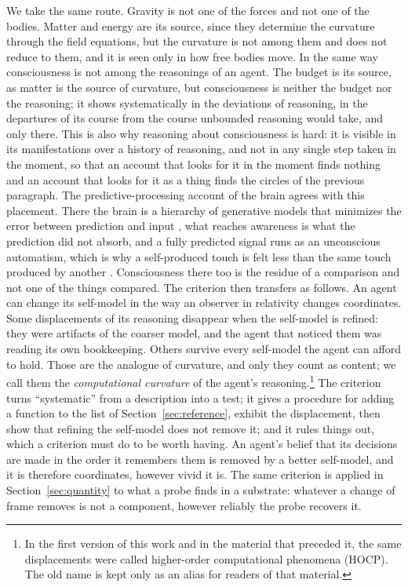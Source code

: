 We take the same route. Gravity is not one of the forces and not one of the bodies. Matter and energy
are its source, since they determine the curvature through the field equations, but the curvature is
not among them and does not reduce to them, and it is seen only in how free bodies move. In the same
way consciousness is not among the reasonings of an agent. The budget is its source, as matter is the
source of curvature, but consciousness is neither the budget nor the reasoning; it shows
systematically in the deviations of reasoning, in the departures of its course from the course
unbounded reasoning would take, and only there. This is also why reasoning about consciousness is hard: it is visible in its manifestations over
a history of reasoning, and not in any single step taken in the moment, so that an account that looks
for it in the moment finds nothing and an account that looks for it as a thing finds the circles of
the previous paragraph. The predictive-processing account of the brain agrees with this placement.
There the brain is a hierarchy of generative models that minimizes the error between prediction and
input \citep{friston2010,clark2013}, what reaches awareness is what the prediction did not absorb,
and a fully predicted signal runs as an unconscious automatism, which is why a self-produced touch is
felt less than the same touch produced by another \citep{blakemore1998}. Consciousness there too is
the residue of a comparison and not one of the things compared. The criterion then transfers as
follows. An agent can change its self-model in
the way an observer in relativity changes coordinates. Some displacements of its reasoning disappear when the
self-model is refined: they were artifacts of the coarser model, and the agent that noticed them was
reading its own bookkeeping. Others survive every self-model the agent can afford to hold. Those are
the analogue of curvature, and only they count as content; we call them the \emph{computational
curvature} of the agent's reasoning.\footnote{In the first version of this work and in the material
that preceded it, the same displacements were called higher-order computational phenomena (HOCP). The
old name is kept only as an alias for readers of that material.} The criterion turns ``systematic'' from a
description into a test; it gives a procedure for adding a function to the list of
Section~\ref{sec:reference}, exhibit the displacement, then show that refining the self-model does not
remove it; and it rules things out, which a criterion must do to be worth having. An agent's belief
that its decisions are made in the order it remembers them is removed by a better self-model, and it is
therefore coordinates, however vivid it is. The same criterion is applied in Section~\ref{sec:quantity}
to what a probe finds in a substrate: whatever a change of frame removes is not a component, however
reliably the probe recovers it.

